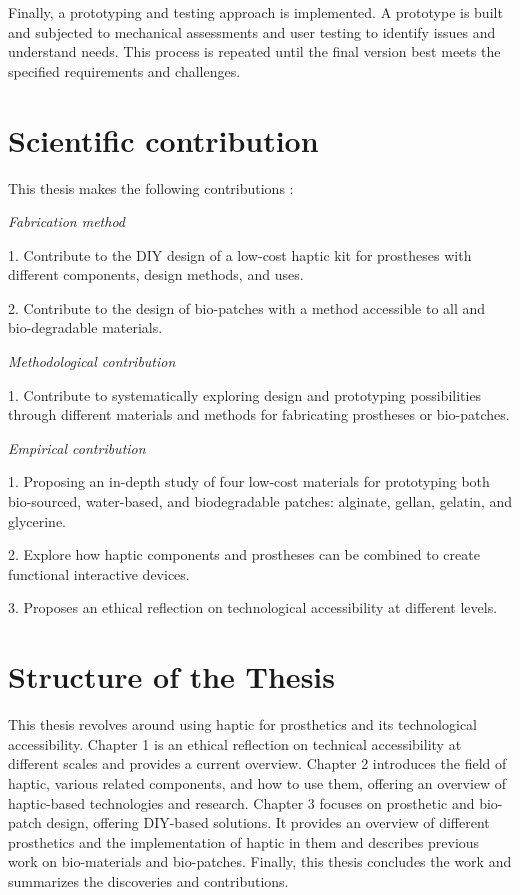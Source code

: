 Finally, a prototyping and testing approach is implemented. A prototype is built and subjected to mechanical assessments and user testing to identify issues and understand needs. This process is repeated until the final version best meets the specified requirements and challenges.

\section{Scientific contribution}
This thesis makes the following contributions :

\textit{Fabrication method}

\item 1. Contribute to the DIY design of a low-cost haptic kit for prostheses with different components, design methods, and uses.
\item 2. Contribute to the design of bio-patches with a method accessible to all and bio-degradable materials.

\textit{Methodological contribution}

\item 1. Contribute to systematically exploring design and prototyping possibilities through different materials and methods for fabricating prostheses or bio-patches.

\textit{Empirical contribution}

\item 1. Proposing an in-depth study of four low-cost materials for prototyping both bio-sourced, water-based, and biodegradable patches: alginate, gellan, gelatin, and glycerine. 
\item 2. Explore how haptic components and prostheses can be combined to create functional interactive devices.
\item 3. Proposes an ethical reflection on technological accessibility at different levels.

\section{Structure of the Thesis}
This thesis revolves around using haptic for prosthetics and its technological accessibility. Chapter 1 is an ethical reflection on technical accessibility at different scales and provides a current overview. Chapter 2 introduces the field of haptic, various related components, and how to use them, offering an overview of haptic-based technologies and research. Chapter 3 focuses on prosthetic and bio-patch design, offering DIY-based solutions. It provides an overview of different prosthetics and the implementation of haptic in them and describes previous work on bio-materials and bio-patches. Finally, this thesis concludes the work and summarizes the discoveries and contributions.